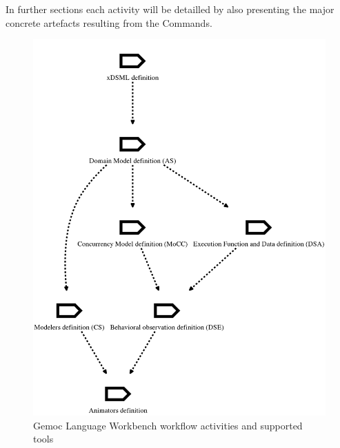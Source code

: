 \documentclass{gemoc} %
\begin{document}
In further sections each activity will be detailled by also presenting the major concrete artefacts resulting from the Commands.
\begin{figure}[h!]
		\center
		\includegraphics*[trim=0.0cm 0.0cm 0cm 0.0cm, clip=true]{fig/Gemoc_language_workbench_workflow}
		\caption{Gemoc Language Workbench workflow activities and supported tools}
		\label{fig:Gemoc_language_workbench_workflow}
\end{figure}
\end{document}

